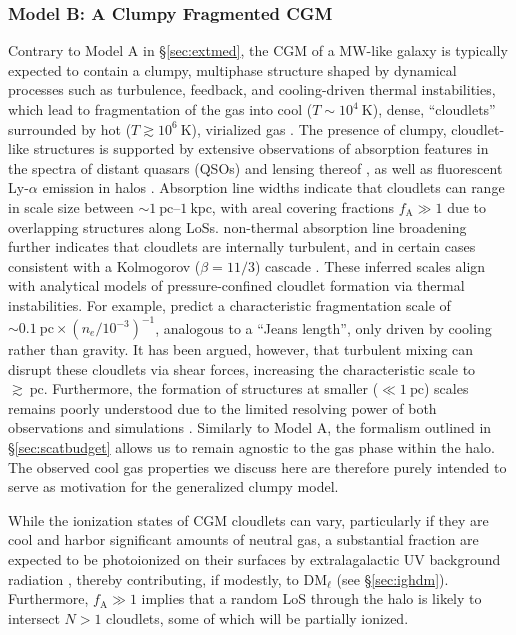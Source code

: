 \documentclass[twocolumn, linenumbers, tra]{aastex631}
\newcommand{\rev}[1]{{\color{purple}#1}}
\begin{document}
\subsubsection{\texorpdfstring{Model B: A \rev{Clumpy Fragmented} CGM}{}}\label{sec:cloud}

\rev{Contrary to Model A in \S\protect\ref{sec:extmed}, the CGM of a MW-like galaxy is typically expected to contain a clumpy, multiphase structure shaped by dynamical processes such as turbulence, feedback, and cooling-driven thermal instabilities, which lead to fragmentation of the gas into cool ($T \sim 10^4\ \mathrm{K}$), dense, ``cloudlets'' surrounded by hot ($T \gtrsim 10^6\ \mathrm{K}$), virialized gas \citep{Tumlinson2017, FaucherGiguere2023}. The presence of clumpy, cloudlet-like structures is supported by extensive observations of absorption features in the spectra of distant quasars (QSOs) and lensing thereof \citep{Lau2016}, as well as fluorescent Ly-$\alpha$ emission in halos \citep{Hennawi2015}. Absorption line widths indicate that cloudlets can range in scale size between $ \sim 1\ \mathrm{pc}$--$1\ \mathrm{kpc}$, with areal covering fractions $f_{\mathrm{A}} \gg 1$ due to overlapping structures along LoSs. non-thermal absorption line broadening further indicates that cloudlets are internally turbulent, and in certain cases consistent with a Kolmogorov ($\beta = 11/3$) cascade \citep{Chen2023, MChen2023}. These inferred scales align with analytical models of pressure-confined cloudlet formation via thermal instabilities. For example, \citet{McCourt2018} predict a characteristic fragmentation scale of $ \sim 0.1\ \mathrm{pc} \times (n_e/10^{-3})^{-1}$, analogous to a ``Jeans length'', only driven by cooling rather than gravity. It has been argued, however, that turbulent mixing can disrupt these cloudlets via shear forces, increasing the characteristic scale to $\gtrsim\ \mathrm{pc}$. Furthermore, the formation of structures at smaller ($\ll 1\ \mathrm{pc}$) scales remains poorly understood due to the limited resolving power of both observations and simulations \citep{Hummels2019, Butsky2024}. Similarly to Model A, the formalism outlined in \S\ref{sec:scatbudget} allows us to remain agnostic to the gas phase within the halo. The observed cool gas properties we discuss here are therefore purely intended to serve as motivation for the generalized clumpy model.

While the ionization states of CGM cloudlets can vary, particularly if they are cool and harbor significant amounts of neutral gas, a substantial fraction are expected to be photoionized on their surfaces by extralagalactic UV background radiation \citep{Werk2014}, thereby contributing, if modestly, to $\mathrm{DM}_\ell$ (see \S\ref{sec:ighdm}). Furthermore, $f_{\mathrm{A}} \gg 1$ implies that a random LoS through the halo is likely to intersect $N>1$ cloudlets, some of which will be partially ionized. 

}
\end{document}
